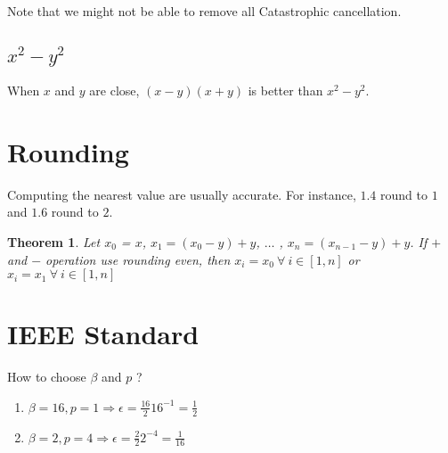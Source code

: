 \documentclass{article}
\newtheorem{theorem}{Theorem}
\begin{document}
        Note that we might not be able to remove all Catastrophic cancellation.

        \subsection{$x^2 - y^2$}

        When $x$ and $y$ are close, $(x-y)(x+y)$ is better than $x^2 - y^2$.
        
        \section{Rounding}

        Computing the nearest value are usually accurate.
        For instance, $1.4$ round to $1$ and  $1.6$ round to $2$.

        \begin{theorem}
            Let $x_0$ = $x$, $x_1 = (x_0-y)+y$, $\dots$ , $x_n = (x_{n-1}-y)+y$.
            If $+$ and $-$ operation use rounding even, then
            $x_i = x_0 \ \forall \ i \in [1, n]$ or 
            $x_i = x_1 \ \forall \ i \in [1, n]$
        \end{theorem}

        \section{IEEE Standard}

        How to choose $\beta$ and $p$ ?

        \begin{enumerate}
            \item $\beta = 16, p = 1 \Rightarrow \epsilon = \frac{16}{2}16^{-1} = \frac{1}{2}$ 
            \item $\beta = 2, p = 4 \Rightarrow \epsilon = \frac{2}{2}2^{-4} = \frac{1}{16}$ 
        \end{enumerate}
        
\end{document}
